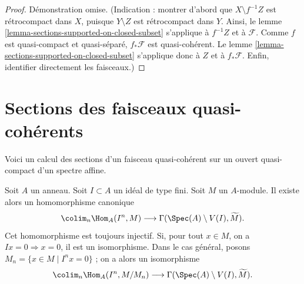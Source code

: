 \begin{proof}
Démonstration omise. (Indication : montrer d'abord que $X \setminus f^{-1}Z$ est rétrocompact
dans $X$, puisque $Y \setminus Z$ est rétrocompact dans $Y$. Ainsi,
le lemme \ref{lemma-sections-supported-on-closed-subset}
s'applique à $f^{-1}Z$ et à $\mathcal{F}$. Comme $f$ est quasi-compact et
quasi-séparé, $f_*\mathcal{F}$ est quasi-cohérent.
Le lemme \ref{lemma-sections-supported-on-closed-subset}
s'applique donc à $Z$ et à $f_*\mathcal{F}$. Enfin, identifier directement
les faisceaux.)
\end{proof}

\section{Sections des faisceaux quasi-cohérents}
\label{section-sections-quasi-coherent}

\noindent
Voici un calcul des sections d'un faisceau quasi-cohérent sur un ouvert quasi-compact
d'un spectre affine.

\begin{lemma}
\label{lemma-sections-over-quasi-compact-open-in-affine}
Soit $A$ un anneau.
Soit $I \subset A$ un idéal de type fini.
Soit $M$ un $A$-module.
Il existe alors un homomorphisme canonique
$$
\colim_n \Hom_A(I^n, M)
\longrightarrow
\Gamma(\Spec(A) \setminus V(I), \widetilde{M}).
$$
Cet homomorphisme est toujours injectif.
Si, pour tout $x \in M$, on a $Ix = 0 \Rightarrow x = 0$,
il est un isomorphisme. Dans le cas général, posons
$M_n = \{x \in M \mid I^nx = 0\}$ ; on a alors un
isomorphisme
$$
\colim_n \Hom_A(I^n, M/M_n)
\longrightarrow
\Gamma(\Spec(A) \setminus V(I), \widetilde{M}).
$$
\end{lemma}

